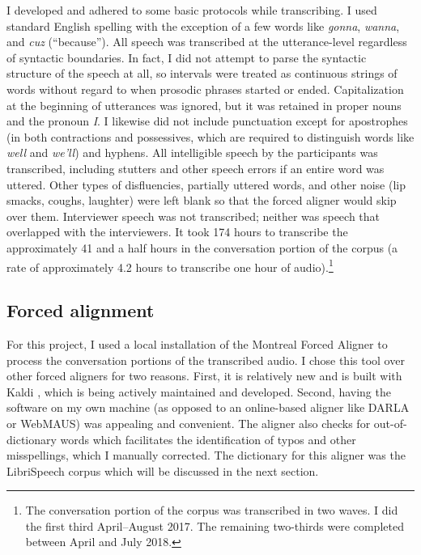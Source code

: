 I developed and adhered to some basic protocols while transcribing. I used standard English spelling with the exception of a few words like \textit{gonna}, \textit{wanna}, and \textit{cuz} (``because''). All speech was transcribed at the utterance-level regardless of syntactic boundaries. In fact, I did not attempt to parse the syntactic structure of the speech at all, so intervals were treated as continuous strings of words without regard to when prosodic phrases started or ended. Capitalization at the beginning of utterances was ignored, but it was retained in proper nouns and the pronoun \textit{I}. I likewise did not include punctuation except for apostrophes (in both contractions and possessives, which are required to distinguish words like \textit{well} and \textit{we'll}) and hyphens. All intelligible speech by the participants was transcribed, including stutters and other speech errors if an entire word was uttered. Other types of disfluencies, partially uttered words, and other noise (lip smacks, coughs, laughter) were left blank so that the forced aligner would skip over them. Interviewer speech was not transcribed; neither was speech that overlapped with the interviewers. It took 174 hours to transcribe the approximately 41 and a half hours in the conversation portion of the corpus (a rate of approximately 4.2 hours to transcribe one hour of audio).\footnote{The conversation portion of the corpus was transcribed in two waves. I did the first third April--August 2017. The remaining two-thirds were completed between April and July 2018.}

\subsection{Forced alignment}
\label{forced_alignment}

For this project, I used a local installation of the Montreal Forced Aligner \citep{macauliffe_etal_2017_MFA} to process the conversation portions of the transcribed audio. I chose this tool over other forced aligners for two reasons. First, it is relatively new and is built with Kaldi \citep{povey_etal_2011_kaldi}, which is being actively maintained and developed. Second, having the software on my own machine (as opposed to an online-based aligner like DARLA or WebMAUS) was appealing and convenient. The aligner also checks for out-of-dictionary words which facilitates the identification of typos and other misspellings, which I manually corrected. The dictionary for this aligner was the LibriSpeech corpus which will be discussed in the next section.

